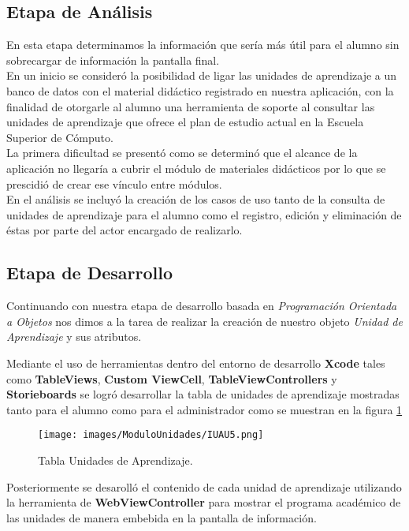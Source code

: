 \subsection{Etapa de Análisis}
En esta etapa determinamos la información que sería más útil para el alumno sin sobrecargar de información la pantalla final. \\
En un inicio se consideró la posibilidad de ligar las unidades de aprendizaje a un banco de datos con el material didáctico registrado en nuestra aplicación, con la finalidad de otorgarle al alumno una herramienta de soporte al consultar las unidades de aprendizaje que ofrece el plan de estudio actual en la Escuela Superior de Cómputo. \\
La primera dificultad se presentó como se determinó que el alcance de la aplicación no llegaría a cubrir el módulo de materiales didácticos por lo que se prescidió de crear ese vínculo entre módulos. \\
En el análisis se incluyó la creación de los casos de uso tanto de la consulta de unidades de aprendizaje para el alumno como el registro, edición y eliminación de éstas por parte del actor encargado de realizarlo.


\subsection{Etapa de Desarrollo}
Continuando con nuestra etapa de desarrollo basada en \textit{Programación Orientada a Objetos} nos dimos a la tarea de realizar la creación de nuestro objeto \textit{Unidad de Aprendizaje} y sus atributos.

Mediante el uso de herramientas dentro del entorno de desarrollo \textbf{Xcode} tales como \textbf{TableViews}, \textbf{Custom ViewCell}, \textbf{TableViewControllers} y \textbf{Storieboards} se logró desarrollar la tabla de unidades de aprendizaje mostradas tanto para el alumno como para el administrador como se muestran en la figura \ref{unidades}

\begin{figure}[h!]
	\begin{center}
		\texttt{[image: images/ModuloUnidades/IUAU5.png]}
		\caption{Tabla Unidades de Aprendizaje.}
		\label{unidades}
	\end{center}
\end{figure}

Posteriormente se desarolló el contenido de cada unidad de aprendizaje utilizando la herramienta de \textbf{WebViewController} para mostrar el programa académico de las unidades de manera embebida en la pantalla de información. \\

